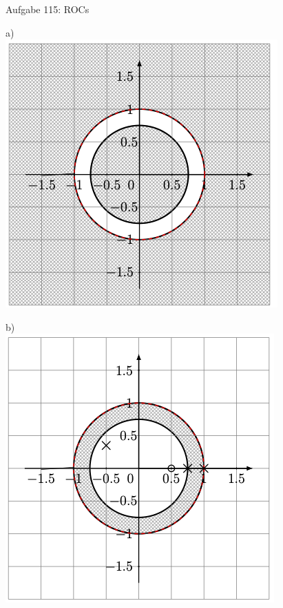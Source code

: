 \documentclass[14pt, aspectratio=169, handout]{beamer}
\begin{document}
\begin{frame}{Aufgabe 115: ROCs}
    \begin{minipage}[t]{0.25\textwidth}
    a)\\
    \includegraphics[width=\linewidth]{figures/a.png}
\end{minipage}
\hfill
\begin{minipage}[t]{0.25\textwidth}
    b)\\
    \includegraphics[width=\linewidth]{figures/b.png}

\end{minipage}
\end{frame}
\end{document}

